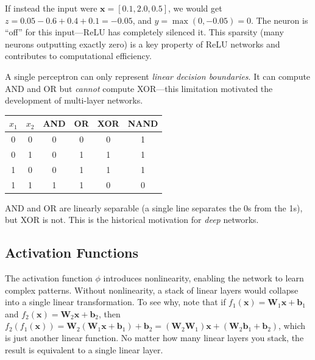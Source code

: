 If instead the input were $\mathbf{x} = [0.1, 2.0, 0.5]$, we would get $z = 0.05 - 0.6 + 0.4 + 0.1 = -0.05$, and $y = \max(0, -0.05) = 0$. The neuron is ``off'' for this input---ReLU has completely silenced it. This sparsity (many neurons outputting exactly zero) is a key property of ReLU networks and contributes to computational efficiency.

A single perceptron can only represent \emph{linear decision boundaries}. It can compute AND and OR but \emph{cannot} compute XOR---this limitation motivated the development of multi-layer networks.

\begin{center}
\renewcommand{\arraystretch}{1.1}
\begin{tabular}{cccccc}
\toprule
$x_1$ & $x_2$ & AND & OR & XOR & NAND \\
\midrule
0 & 0 & 0 & 0 & 0 & 1 \\
0 & 1 & 0 & 1 & 1 & 1 \\
1 & 0 & 0 & 1 & 1 & 1 \\
1 & 1 & 1 & 1 & 0 & 0 \\
\bottomrule
\end{tabular}
\end{center}

AND and OR are linearly separable (a single line separates the 0s from the 1s), but XOR is not. This is the historical motivation for \emph{deep} networks.

\subsection{Activation Functions}

The activation function $\phi$ introduces nonlinearity, enabling the network to learn complex patterns. Without nonlinearity, a stack of linear layers would collapse into a single linear transformation. To see why, note that if $f_1(\mathbf{x}) = \mathbf{W}_1 \mathbf{x} + \mathbf{b}_1$ and $f_2(\mathbf{x}) = \mathbf{W}_2 \mathbf{x} + \mathbf{b}_2$, then $f_2(f_1(\mathbf{x})) = \mathbf{W}_2(\mathbf{W}_1 \mathbf{x} + \mathbf{b}_1) + \mathbf{b}_2 = (\mathbf{W}_2 \mathbf{W}_1)\mathbf{x} + (\mathbf{W}_2 \mathbf{b}_1 + \mathbf{b}_2)$, which is just another linear function. No matter how many linear layers you stack, the result is equivalent to a single linear layer.

